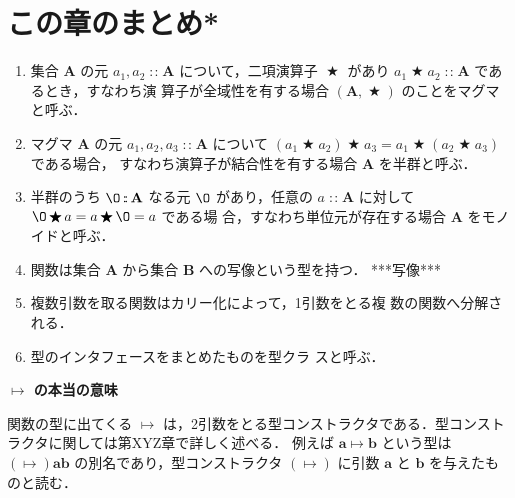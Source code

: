\documentclass[a5paper,twoside,fleqn,draft]{jsbook}
\newcommand{\programminglanguage}[1]{\textsf{#1}}
\newcommand{\haskell}{\programminglanguage{Haskell}}
\newenvironment{note}[1]{\begin{boxnote}\begin{center}\textbf{#1}\end{center}}{\end{boxnote}}
\newcommand{\code}[1]{\texttt{#1}}
\newcommand{\mZero}{\O}
\DeclareMathOperator{\mBinOp}{\bigstar}
\DeclareMathOperator{\mIn}{{:\!:}}
\DeclareMathOperator{\mMapsTo}{\mapsto}
\DeclareMathOperator{\mPlus}{\maltese}
\newcommand{\mSet}[1]{\mathbf{#1}}
\newcommand{\mType}[1]{\mathbf{#1}}
\newcommand{\mTupleWith}[1]{\left(#1\right)}
\newcommand{\mGenericTypeClass}[1]{\textsc{#1}} %
\newcommand{\mMonoidTypeClass}{\mGenericTypeClass{Monoid}}
\newcommand{\mProj}[2]{#1\mMapsTo#2}
\begin{document}

\section{この章のまとめ*}

\begin{enumerate}
\item 集合 $\mSet{A}$ の元 $a_1,a_2\mIn\mSet{A}$ について，二項演算子
  $\mBinOp$ があり $a_1\mBinOp a_2\mIn\mSet{A}$ であるとき，すなわち演
  算子が全域性を有する場合 $(\mSet{A},\mBinOp)$ のことをマグマと呼ぶ．
\item マグマ $\mSet{A}$ の元 $a_1,a_2,a_3\mIn\mSet{A}$ について
  $(a_1\mBinOp a_2)\mBinOp a_3=a_1\mBinOp(a_2\mBinOp a_3)$ である場合，
  すなわち演算子が結合性を有する場合 $\mSet{A}$ を半群と呼ぶ．
\item 半群のうち $\mZero\mIn\mSet{A}$ なる元 $\mZero$ があり，任意の
$a\mIn\mSet{A}$ に対して $\mZero\mBinOp a=a\mBinOp\mZero=a$ である場
合，すなわち単位元が存在する場合 $\mSet{A}$ をモノイドと呼ぶ．\item
関数は集合 $\mSet{A}$ から集合 $\mSet{B}$ への写像という型を持つ． %
***写像*** \item 複数引数を取る関数はカリー化によって，1引数をとる複
数の関数へ分解される．\item 型のインタフェースをまとめたものを型クラ
スと呼ぶ． %
\end{enumerate}

\begin{note}{$\mMapsTo$ の本当の意味}
関数の型に出てくる $\mMapsTo$ は，2引数をとる型コンストラクタである．型コンストラクタに関しては第XYZ章で詳しく述べる．
例えば $\mProj{\mType{a}}{\mType{b}}$ という型は $(\mMapsTo)\mType{a}\mType{b}$ の別名であり，型コンストラクタ $(\mMapsTo)$ に引数 $\mType{a}$ と $\mType{b}$ を与えたものと読む．
\end{note}
\end{document}
